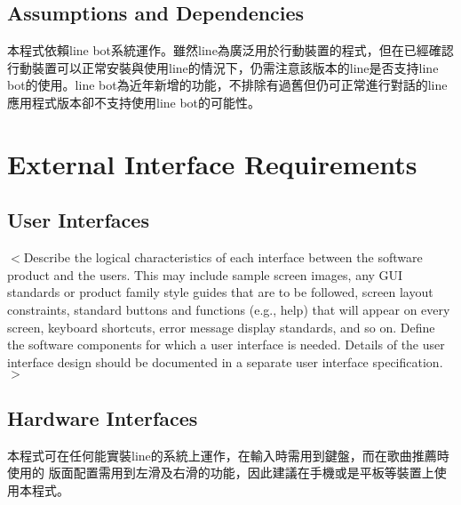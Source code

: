 \documentclass{scrreprt}
\begin{document}
\section{Assumptions and Dependencies}
\begin{CJK}{UTF8}{<font>}
本程式依賴line bot系統運作。雖然line為廣泛用於行動裝置的程式，但在已經確認行動裝置可以正常安裝與使用line的情況下，仍需注意該版本的line是否支持line bot的使用。line bot為近年新增的功能，不排除有過舊但仍可正常進行對話的line應用程式版本卻不支持使用line bot的可能性。
\end{CJK}

\chapter{External Interface Requirements}

\section{User Interfaces}
\begin{CJK}{UTF8}{<font>}
$<$Describe the logical characteristics of each interface between the software 
product and the users. This may include sample screen images, any GUI standards 
or product family style guides that are to be followed, screen layout 
constraints, standard buttons and functions (e.g., help) that will appear on 
every screen, keyboard shortcuts, error message display standards, and so on.  
Define the software components for which a user interface is needed. Details of 
the user interface design should be documented in a separate user interface 
specification.$>$
\end{CJK}

\section{Hardware Interfaces}
\begin{CJK}{UTF8}{<font>}
本程式可在任何能實裝line的系統上運作，在輸入時需用到鍵盤，而在歌曲推薦時使用的
版面配置需用到左滑及右滑的功能，因此建議在手機或是平板等裝置上使用本程式。
\end{CJK}
\end{document}
